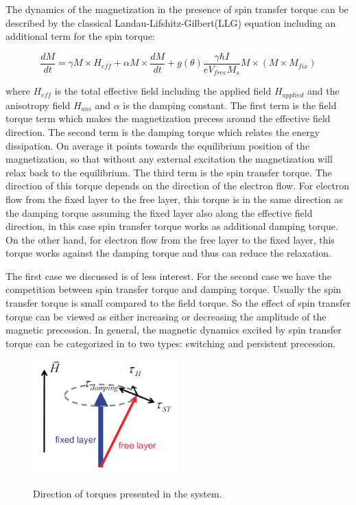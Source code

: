 The dynamics of the magnetization in the presence of spin transfer torque can be described by the classical Landau-Lifshitz-Gilbert(LLG) equation including an additional term for the spin torque:

\begin{equation}
\frac{dM}{dt} = \gamma M \times H_{eff} + \alpha M \times \frac{dM}{dt} + g(\theta)\frac{\gamma \hbar I}{eV_{free}M_s}M \times(M \times M_{fix})
\end{equation}

where $H_{eff}$ is the total effective field including the applied field $H_{applied}$ and the anisotropy field $H_{ani}$ and $\alpha$ is the damping constant. The first term is the field torque term which makes the magnetization precess around the effective field direction. The second term is the damping torque which relates the energy dissipation. On average it points towards the equilibrium position of the magnetization, so that without any external excitation the magnetization will relax back to the equilibrium. The third term is the spin transfer torque. The direction of this torque depends on the direction of the electron flow. For electron flow from the fixed layer to the free layer, this torque is in the same direction as the damping torque assuming the fixed layer also along the effective field direction, in this case spin transfer torque works as additional damping torque. On the other hand, for electron flow from the free layer to the fixed layer, this torque works against the damping torque and thus can reduce the relaxation.

The first case we discussed is of less interest. For the second case we have the competition between spin transfer torque and damping torque\cite{Bias}. Usually the spin transfer torque is small compared to the field torque. So the effect of spin transfer torque can be viewed as either increasing or decreasing the amplitude of the magnetic precession. In general, the magnetic dynamics excited by spin transfer torque can be categorized in to two types: switching and persistent precession.

\begin{figure}[h!]
\centering
\includegraphics[width=0.5\textwidth]{fig/dampingtorque.PNG}
\label{Torque}
\caption{Direction of torques presented in the system.}

\end{figure}


